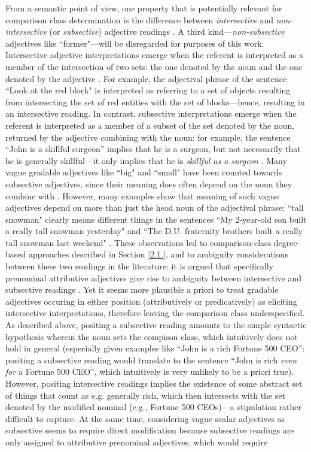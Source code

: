 From a semantic point of view, one property that is potentially relevant for comparison class determination is the difference between \textit{intersective} and \textit{non-intersective} (or \textit{subsective}) adjective readings \parencite{sedivy1999, kennedy2012, hofherr2010adjectives}. A third kind---\textit{non-subsective} adjectives like ``former"---will be disregarded for purposes of this work. 
Intersective adjective interpretations emerge when the referent is interpreted as a member of the intersection of two sets: the one denoted by the noun and the one denoted by the adjective \parencite{kennedy2012}. For example, the adjectival phrase of the sentence ``Look at the red block" is interpreted as referring to a set of objects resulting from intersecting the set of red entities with the set of blocks---hence, resulting in an intersective reading.
In contrast, subsective interpretations emerge when the referent is interpreted as a member of a subset of the set denoted by the noun, returned by the adjective combining with the noun: for example, the sentence “John is a skillful surgeon” implies that he is a surgeon, but not necessarily that he is generally skillful---it only implies that he is \emph{skillful as a surgeon} \parencite{kennedy2012}. Many vague gradable adjectives like ``big" and ``small" have been counted towards subsective adjectives, since their meaning does often depend on the noun they combine with \parencite{sedivy1999}. However, many examples show that meaning of such vague adjectives depend on more than just the head noun of the adjectival phrase: ``tall snowman" clearly means different things in the sentences ``My 2-year-old son built a really tall snowman yesterday" and ``The D.U. fraternity brothers built a really tall snowman last weekend" \parencite[p. 115]{sedivy1999}. These observations led to comparison-class degree-based approaches described in Section \ref{2.1.}, and to ambiguity considerations between these two readings in the literature: it is argued that specifically prenominal attributive adjectives give rise to ambiguity between intersective and subsective readings \parencite[cf. ``Olga is a beautiful dancer",][]{hofherr2010adjectives}. Yet it seems more plausible a priori to treat gradable adjectives occuring in either position (attributively or predicatively) as eliciting intersective interpretations, therefore leaving the comparison class underspecified. As described above, positing a subsective reading amounts to the simple syntactic hypothesis wherein the noun sets the compison class, which intuitively does not hold in general (especially given examples like “John is a rich Fortune 500 CEO”: positing a subsective reading would translate to the sentence “John is rich \emph{even for} a Fortune 500 CEO”, which intuitively is very unlikely to be a priori true). However, positing intersective readings implies the existence of some abstract set of things that count as e.g. generally rich, which then intersects with the set denoted by the modified nominal (e.g., Fortune 500 CEOs)---a stipulation rather difficult to capture. At the same time, considering vague scalar adjectives as subsective seems to require direct modification because subsective readings are only assigned to attributive prenominal adjectives, which would require 